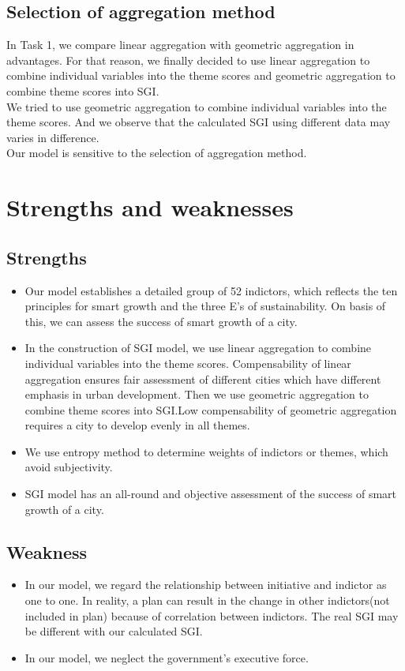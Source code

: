 \documentclass{mcmthesis}
\begin{document}
\subsection{Selection of aggregation method}%
In Task 1, we compare linear aggregation with geometric aggregation in advantages. For that reason, we finally decided to use linear aggregation to combine individual variables into the theme scores and geometric aggregation to combine theme scores into SGI.\\
We tried to use geometric aggregation to combine individual variables into the theme scores. And we observe that the calculated SGI using different data may varies in difference.\\
Our model is sensitive to the selection of aggregation method.\\

\section{Strengths and weaknesses}
\subsection{Strengths}%
\begin{itemize}
\item Our model establishes a detailed group of 52 indictors, which reflects the ten principles for smart growth and the three E's of sustainability. On basis of this, we can assess the success of smart growth of a city.
\item In the construction of SGI model, we use linear aggregation to combine individual variables into the theme scores. Compensability of linear aggregation ensures fair assessment of different cities which have different emphasis in urban development. Then we use geometric aggregation to combine theme scores into SGI.Low compensability of geometric aggregation requires a city to develop evenly in all themes. 
\item We use entropy method to determine weights of indictors or themes, which avoid subjectivity.
\item SGI model has an all-round and objective assessment of the success of smart growth of a city.
\end{itemize}
\subsection{Weakness}%
\begin{itemize}
\item In our model, we regard the relationship between initiative and indictor as one to one. In reality, a plan can result in the change in other indictors(not included in plan) because of correlation between indictors. The real SGI may be different with our calculated SGI.
\item In our model, we neglect the government's executive force.
\end{itemize}
\end{document}
